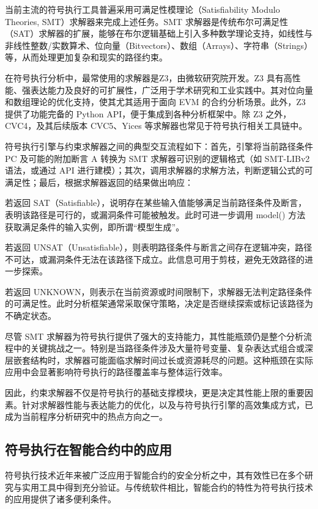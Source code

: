 \documentclass[print, master, vlined, timesmath]{DissertUESTC}
\begin{document}
当前主流的符号执行工具普遍采用可满足性模理论（Satisfiability Modulo Theories, SMT）求解器来完成上述任务。SMT 求解器是传统布尔可满足性（SAT）求解器的扩展，能够在布尔逻辑基础上引入多种数学理论支持，如线性与非线性整数/实数算术、位向量（Bitvectors）、数组（Arrays）、字符串（Strings）等，从而处理更加复杂和现实的路径约束。

在符号执行分析中，最常使用的求解器是Z3，由微软研究院开发。Z3 具有高性能、强表达能力及良好的可扩展性，广泛用于学术研究和工业实践中。其对位向量和数组理论的优化支持，使其尤其适用于面向 EVM 的合约分析场景。此外，Z3 提供了功能完备的 Python API，便于集成到各种分析框架中。除 Z3 之外，CVC4，及其后续版本 CVC5、Yices 等求解器也常见于符号执行相关工具链中。

符号执行引擎与约束求解器之间的典型交互流程如下：首先，引擎将当前路径条件 PC 及可能的附加断言 A 转换为 SMT 求解器可识别的逻辑格式（如 SMT-LIBv2 语法，或通过 API 进行建模）；其次，调用求解器的求解方法，判断逻辑公式的可满足性；最后，根据求解器返回的结果做出响应：

若返回 SAT（Satisfiable），说明存在某些输入值能够满足当前路径条件及断言，表明该路径是可行的，或漏洞条件可能被触发。此时可进一步调用 model() 方法获取满足条件的输入实例，即所谓“模型生成”。

若返回 UNSAT（Unsatisfiable），则表明路径条件与断言之间存在逻辑冲突，路径不可达，或漏洞条件无法在该路径下成立。此信息可用于剪枝，避免无效路径的进一步探索。

若返回 UNKNOWN，则表示在当前资源或时间限制下，求解器无法判定路径条件的可满足性。此时分析框架通常采取保守策略，决定是否继续探索或标记该路径为不确定状态。

尽管 SMT 求解器为符号执行提供了强大的支持能力，其性能瓶颈仍是整个分析流程中的关键挑战之一。特别是当路径条件涉及大量符号变量、复杂表达式组合或深层嵌套结构时，求解器可能面临求解时间过长或资源耗尽的问题。这种瓶颈在实际应用中会显著影响符号执行的路径覆盖率与整体运行效率。

因此，约束求解器不仅是符号执行的基础支撑模块，更是决定其性能上限的重要因素。针对求解器性能与表达能力的优化，以及与符号执行引擎的高效集成方式，已成为当前程序分析研究中的热点方向之一。

\subsection{符号执行在智能合约中的应用}

符号执行技术近年来被广泛应用于智能合约的安全分析之中，其有效性已在多个研究与实用工具中得到充分验证。与传统软件相比，智能合约的特性为符号执行技术的应用提供了诸多便利条件。
\end{document}
